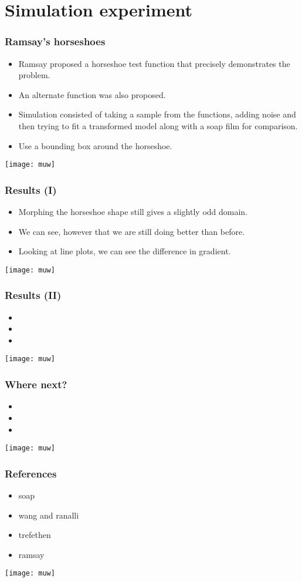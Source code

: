 \documentclass[ignorenonframetext]{beamer} %
\newcommand{\bc}{\begin{center}}
\newcommand{\ec}{\end{center}}
\newcommand{\bi}{\begin{itemize}}
\newcommand{\ei}{\end{itemize}}
\begin{document}
\section{Simulation experiment}

\begin{frame}
	\frametitle{Ramsay's horseshoes}
       \bi
         \item Ramsay proposed a horseshoe test function that precisely demonstrates the problem. 
         \item An alternate function was also proposed.
         \item Simulation consisted of taking a sample from the functions, adding noise and then trying to fit a transformed model along with a soap film for comparison.
         \item Use a bounding box around the horseshoe.
        \ei
        \bc
              \texttt{[image: muw]}
       \ec
\end{frame}

\begin{frame}
	\frametitle{Results (I)}
       \bi
         \item Morphing the horseshoe shape still gives a slightly odd domain. 
         \item We can see, however that we are still doing better than before.
         \item Looking at line plots, we can see the difference in gradient.

        \ei
        \bc
              \texttt{[image: muw]}
       \ec
\end{frame}

\begin{frame}
	\frametitle{Results (II)}
       \bi
         \item 
         \item
         \item 
        \ei
        \bc
              \texttt{[image: muw]}
       \ec
\end{frame}
\begin{frame}
	\frametitle{Where next?}
       \bi
         \item 
         \item
         \item 
        \ei
        \bc
              \texttt{[image: muw]}
       \ec
\end{frame}


\begin{frame}
	\frametitle{References}
       \bi
         \item soap
         \item wang and ranalli
         \item trefethen
         \item ramsay
        \ei
        \bc
              \texttt{[image: muw]}
       \ec
\end{frame}
\end{document}
